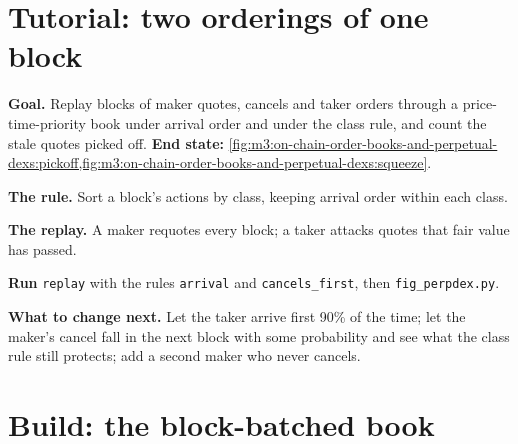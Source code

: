 \section{Tutorial: two orderings of one block}\label{tut:m3:on-chain-order-books-and-perpetual-dexs:replay}

\begin{tutorial}
\textbf{Goal.} Replay blocks of maker quotes, cancels and taker orders through a price-time-priority book under arrival order and under the class rule, and
count the stale quotes picked off. \textbf{End state:} \cref{fig:m3:on-chain-order-books-and-perpetual-dexs:pickoff,fig:m3:on-chain-order-books-and-perpetual-dexs:squeeze}.
\begin{tutsteps}
\item \textbf{The rule.} Sort a block's actions by class, keeping arrival order within each class.
\label{lst:m3:on-chain-order-books-and-perpetual-dexs:order}
\item \textbf{The replay.} A maker requotes every block; a taker attacks quotes that fair value has passed.
\label{lst:m3:on-chain-order-books-and-perpetual-dexs:replay}
\item \textbf{Run} \texttt{replay} with the rules \texttt{arrival} and \texttt{cancels\_first}, then \texttt{fig\_perpdex.py}.
\end{tutsteps}
\textbf{What to change next.} Let the taker arrive first 90\% of the time; let the maker's cancel fall in the next block with some probability and see what the class
rule still protects; add a second maker who never cancels.
\end{tutorial}

\section{Build: the block-batched book}\label{bld:m3:on-chain-order-books-and-perpetual-dexs:blockbook}

